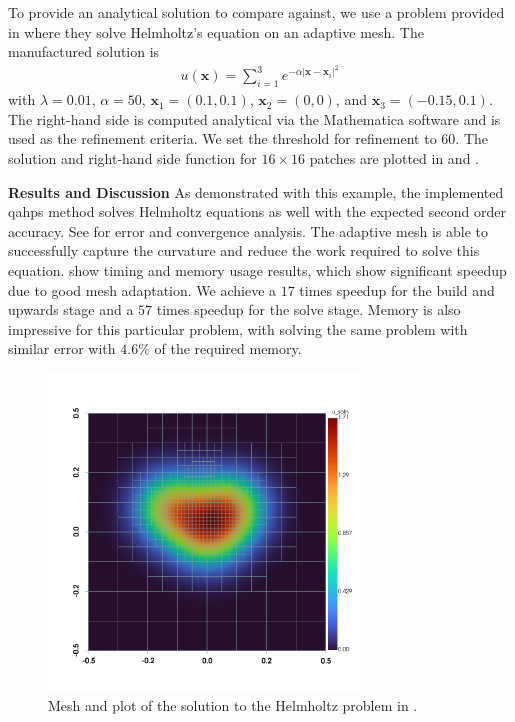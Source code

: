 To provide an analytical solution to compare against, we use a problem provided in \citep{cheng2006adaptive} where they solve Helmholtz's equation on an adaptive mesh. The manufactured solution is
\begin{align}
    u(\textbf{x}) = \sum_{i=1}^{3} e^{-\alpha |\textbf{x} - \textbf{x}_i|^2}
\end{align}
with $\lambda=0.01$, $\alpha=50$, $\textbf{x}_1 = (0.1, 0.1)$, $\textbf{x}_2 = (0, 0)$, and $\textbf{x}_3 = (-0.15, 0.1)$. The right-hand side is computed analytical via the Mathematica software \citep{wolfram2023mathematica} and is used as the refinement criteria. We set the threshold for refinement to $60$. The solution and right-hand side function for $16 \times 16$ patches are plotted in  and .

{\bf Results and Discussion}
As demonstrated with this example, the implemented \gls{qahps} method solves Helmholtz equations as well with the expected second order accuracy. See  for error and convergence analysis. The adaptive mesh is able to successfully capture the curvature and reduce the work required to solve this equation.  show timing and memory usage results, which show significant speedup due to good mesh adaptation. We achieve a $17$ times speedup for the build and upwards stage and a $57$ times speedup for the solve stage. Memory is also impressive for this particular problem, with solving the same problem with similar error with $4.6\%$ of the required memory.

\begin{figure}
    \centering
    \includegraphics[width=0.75\textwidth, trim={0 100 0 0}]{figures/plot_helmholtz_u.png}
    \caption{Mesh and plot of the solution to the Helmholtz problem in .}
    \label{fig:helmholtz_u_plot}
\end{figure}

